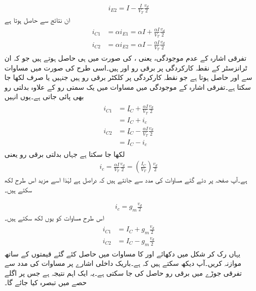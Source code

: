 \begin{align}\label{مساوات_تفرقی_جوڑا_دوسری_برقی_رو}
i_{E2}=I-\frac{I}{V_T}\frac{v_d}{2}
\end{align}
ان نتائج سے حاصل ہوتا ہے
\begin{gather}
\begin{aligned} \label{مساوات_تفرقی_پہلی_رو_تسلسل_کے_دو_جز}
i_{C1}&=\alpha i_{E1}=\alpha I +\frac{\alpha I}{V_T} \frac{v_d}{2}\\
i_{C2}&=\alpha i_{E2}=\alpha I -\frac{\alpha I}{V_T} \frac{v_d}{2}
\end{aligned}
\end{gather}
تفرقی اشارہ کے عدم موجودگی، یعنی  ، کی صورت میں   ہی حاصل ہوتے ہیں جو کہ ان ٹرانزسٹر کے نقطہ کارکردگی پر برقی رو  اور   ہیں۔اسی طرح  کی صورت میں مساوات   سے  اور  حاصل ہوتا ہے جو نقطہ کارکردگی پر کلکٹر برقی رو ہیں جنہیں  یا صرف  لکھا جا سکتا ہے۔تفرقی اشارہ کے موجودگی میں مساوات  میں یک سمتی رو کے علاوہ بدلتی رو بھی پائی جاتی ہے۔یوں انہیں
\begin{gather}
\begin{aligned}
i_{C1}&=ِI_{C}+\frac{\alpha I}{V_T} \frac{v_d}{2}\\
&=I_{C}+i_c\\
i_{C2}&=ِI_{C}-\frac{\alpha I}{V_T} \frac{v_d}{2}\\
&=I_{C}-i_c
\end{aligned}
\end{gather}
لکھا جا سکتا ہے جہاں   بدلتی برقی رو یعنی
\begin{align}
i_c=\frac{\alpha I}{V_T}\frac{v_d}{2}=\left(\frac{I_{C}}{V_T}\right) \frac{v_d}{2}
\end{align}
ہے۔آپ صفحہ  پر دئے گئے مساوات  کی مدد سے جانتے ہیں کہ  دراصل  ہے لہٰذا اسے مزید اس طرح لکھ سکتے ہیں۔

\begin{align} \label{مساوات_تفرقی_اشاراتی_رو}
i_c=g_m \frac{v_d}{2}
\end{align}
اس طرح مساوات  کو یوں لکھ سکتے ہیں۔
\begin{gather}
\begin{aligned}
i_{C1}&=I_{C}+g_m \frac{v_d}{2}\\
i_{C2}&=I_{C} - g_m \frac{v_d}{2}
\end{aligned}
\end{gather}
یہاں رک کر شکل   میں دکھائے  اور  کا مساوات  میں حاصل کئے گئے قیمتوں کے ساتھ موازنہ کریں۔آپ دیکھ سکتے ہیں کہ  ہے۔باریک داخلی اشارے پر  مساوات   کی مدد سے  تفرقی جوڑے میں برقی رو   حاصل کی جا سکتی ہے۔یہ ایک اہم نتیجہ ہے جس پر اگلے حصے میں تبصرہ کیا جائے گا۔


